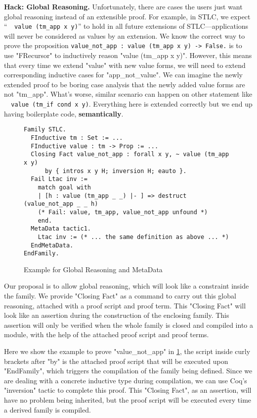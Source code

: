 
\textbf{Hack: Global Reasoning.}
Unfortunately, there are cases the users just want global reasoning
instead of an extensible proof. For example, in STLC, we expect
``\texttt{~ value (tm_app x y)}'' to hold in all future
extensions of STLC---applications will never be considered as values
by an extension.
We know the correct way to prove the proposition
\texttt{value_not_app : value (tm_app x y) -> False.} is to use
"FRecursor" to inductively reason "value (tm_app x y)". However, this
means that every time we extend "value" with new value forms, we will
need to extend corresponding inductive cases for "app_not_value". We can
imagine the newly extended proof to be boring case analysis that the
newly added value forms are not "tm_app". What's worse, similar
scenario can happen on other statement like \texttt{~ value
(tm_if cond x y)}. Everything here is extended correctly but we end up
having boilerplate code, \textbf{semantically}.
\begin{figure}[!htb]
\begin{verbatim}
Family STLC.
  FInductive tm : Set := ... 
  FInductive value : tm -> Prop := ... 
  Closing Fact value_not_app : forall x y, ~ value (tm_app x y) 
      by { intros x y H; inversion H; eauto }.
  Fail Ltac inv := 
    match goal with 
    | [h : value (tm_app _ _) |- ] => destruct (value_not_app _ _ h)
    (* Fail: value, tm_app, value_not_app unfound *)
    end. 
  MetaData tactic1.
    Ltac inv := (* ... the same definition as above ... *)
  EndMetaData.
EndFamily.
\end{verbatim}  
\caption{Example for Global Reasoning and MetaData}\label{fig:plugin-example-global-reasoning-meta-data}
\end{figure}


Our proposal is to allow global reasoning, which will look like a
constraint inside the family. We provide "Closing Fact" as a command to
carry out this global reasoning, attached with a proof script and proof
term. This "Closing Fact" will look like an assertion during the
construction of the enclosing family. This assertion will only be
verified when the whole family is closed and compiled into a module,
with the help of the attached proof script and proof terms.

Here we show the example to prove "value_not_app" in
\cref{fig:plugin-example-global-reasoning-meta-data}, the script inside
curly brackets after "by" is the attached proof script that will be
executed upon "EndFamily", which triggers the compilation of the family
being defined.
Since we are dealing with a concrete inductive type during compilation,
we can use Coq's "inversion" tactic to complete this proof.
This "Closing Fact", as an assertion, will have no problem being
inherited, but the proof script will be executed every time a derived
family is compiled.

